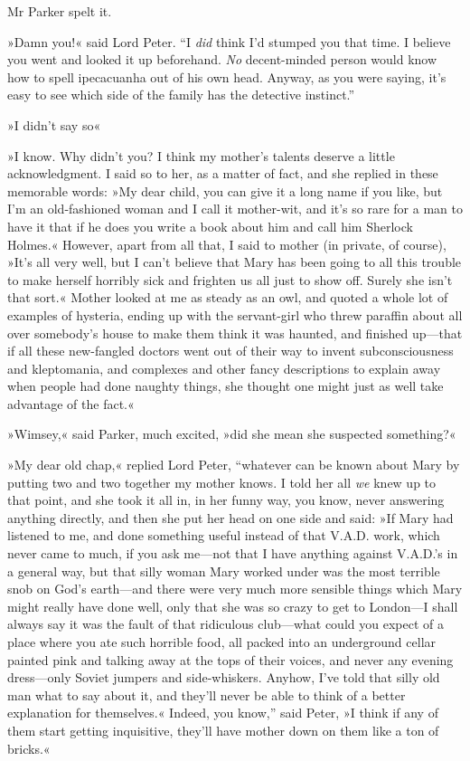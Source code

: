 Mr Parker spelt it.

»Damn you!« said Lord Peter. \enquote{I \textit{did} think I'd stumped you that time.  I believe you went and looked it up beforehand. \textit{No} decent-minded person would know how to spell ipecacuanha out of his own head. Anyway, as you were saying, it's easy to see which side of the family has the detective instinct.}

»I didn't say so\longdash«

»I know. Why didn't you? I think my mother's talents deserve a little acknowledgment. I said so to her, as a matter of fact, and she replied in these memorable words: »My dear child, you can give it a long name if you like, but I'm an old-fashioned woman and I call it mother-wit, and it's so rare for a man to have it that if he does you write a book about him and call him Sherlock Holmes.« However, apart from all that, I said to mother (in private, of course), »It's all very well, but I can't believe that Mary has been going to all this trouble to make herself horribly sick and frighten us all just to show off. Surely she isn't that sort.« Mother looked at me as steady as an owl, and quoted a whole lot of examples of hysteria, ending up with the servant-girl who threw paraffin about all over somebody's house to make them think it was haunted, and finished up—that if all these new-fangled doctors went out of their way to invent subconsciousness and kleptomania, and complexes and other fancy descriptions to explain away when people had done naughty things, she thought one might just as well take advantage of the fact.«

»Wimsey,« said Parker, much excited, »did she mean she suspected something?«

»My dear old chap,« replied Lord Peter, \enquote{whatever can be known about Mary by putting two and two together my mother knows. I told her all \textit{we} knew up to that point, and she took it all in, in her funny way, you know, never answering anything directly, and then she put her head on one side and said: »If Mary had listened to me, and done something useful instead of that V.A.D. work, which never came to much, if you ask me—not that I have anything against V.A.D.'s in a general way, but that silly woman Mary worked under was the most terrible snob on God's earth—and there were very much more sensible things which Mary might really have done well, only that she was so crazy to get to London—I shall always say it was the fault of that ridiculous club—what could you expect of a place where you ate such horrible food, all packed into an underground cellar painted pink and talking away at the tops of their voices, and never any evening dress—only Soviet jumpers and side-whiskers. Anyhow, I've told that silly old man what to say about it, and they'll never be able to think of a better explanation for themselves.« Indeed, you know,} said Peter, »I think if any of them start getting inquisitive, they'll have mother down on them like a ton of bricks.«

